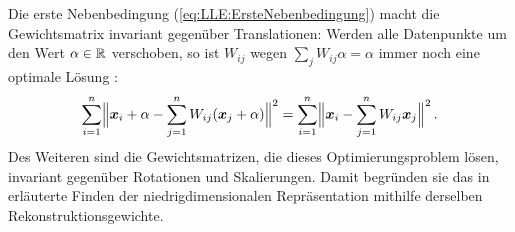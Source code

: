 Die erste Nebenbedingung (\eqref{eq:LLE:ErsteNebenbedingung}) macht die Gewichtsmatrix invariant gegenüber Translationen: Werden alle Datenpunkte um den Wert $\alpha \in \real$ verschoben, so ist $W_{ij}$ wegen $\sum_j W_{ij}\alpha = \alpha$ immer noch eine optimale Lösung \parencite[8]{Cayton.2005}:
\begin{equation}
	\sum_{i = 1}^n \norm[\Big]{ \vect{x}_i + \alpha - \sum_{j = 1}^n W_{ij}(\vect{x}_j + \alpha)}^2 = \sum_{i = 1}^n \norm[\Big]{ \vect{x}_i - \sum_{j = 1}^n W_{ij}\vect{x}_j}^2 \, .
\end{equation}
Des Weiteren sind die Gewichtsmatrizen, die dieses Optimierungsproblem lösen, invariant gegenüber Rotationen und Skalierungen. Damit begründen sie das in  erläuterte Finden der niedrigdimensionalen Repräsentation mithilfe derselben Rekonstruktionsgewichte.

